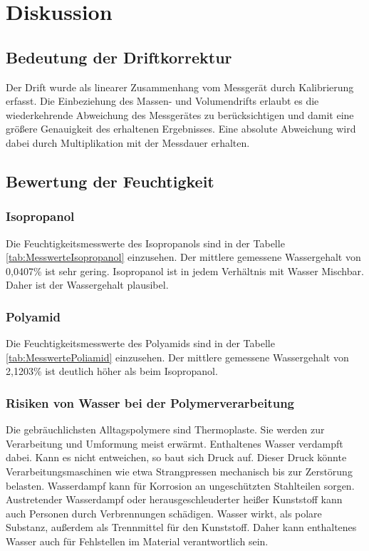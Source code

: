 \section{Diskussion}
\label{sec:diskussion}


\subsection{Bedeutung der Driftkorrektur}
Der Drift wurde als linearer Zusammenhang vom Messgerät durch Kalibrierung erfasst. Die Einbeziehung des Massen- und Volumendrifts erlaubt es die wiederkehrende Abweichung des Messgerätes zu berücksichtigen und damit eine größere Genauigkeit des erhaltenen Ergebnisses. Eine absolute Abweichung wird dabei durch Multiplikation mit der Messdauer erhalten.

\subsection{Bewertung der Feuchtigkeit}

\subsubsection{Isopropanol}
Die Feuchtigkeitsmesswerte des Isopropanols sind in der Tabelle \ref{tab:MesswerteIsopropanol} einzusehen. Der mittlere gemessene Wassergehalt von 0,0407\% ist sehr gering. Isopropanol ist in jedem Verhältnis mit Wasser Mischbar.\cite{isopropanol} Daher ist der Wassergehalt plausibel. 

\subsubsection{Polyamid}

Die Feuchtigkeitsmesswerte des Polyamids sind in der Tabelle \ref{tab:MesswertePoliamid} einzusehen. Der mittlere gemessene Wassergehalt von 2,1203\% ist deutlich höher als beim Isopropanol. 

\subsubsection{Risiken von Wasser bei der Polymerverarbeitung}
Die gebräuchlichsten Alltagspolymere sind Thermoplaste. Sie werden zur Verarbeitung und Umformung meist erwärmt. Enthaltenes Wasser verdampft dabei. Kann es nicht entweichen, so baut sich Druck auf. Dieser Druck könnte Verarbeitungsmaschinen wie etwa Strangpressen mechanisch bis zur Zerstörung belasten. Wasserdampf kann für Korrosion an ungeschützten Stahlteilen sorgen. Austretender Wasserdampf oder herausgeschleuderter heißer Kunststoff kann auch Personen durch Verbrennungen schädigen. Wasser wirkt, als polare Substanz, außerdem als Trennmittel für den Kunststoff. Daher kann enthaltenes Wasser auch für Fehlstellen im Material verantwortlich sein.